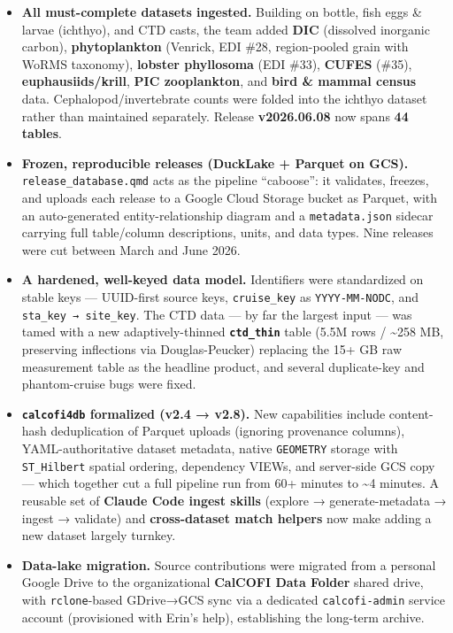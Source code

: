 \documentclass[
  letterpaper,
  DIV=11,
  numbers=noendperiod]{scrreprt}
\begin{document}
\begin{itemize}
\item
  \textbf{All must-complete datasets ingested.} Building on bottle, fish
  eggs \& larvae (ichthyo), and CTD casts, the team added \textbf{DIC}
  (dissolved inorganic carbon), \textbf{phytoplankton} (Venrick, EDI
  \#28, region-pooled grain with WoRMS taxonomy), \textbf{lobster
  phyllosoma} (EDI \#33), \textbf{CUFES} (\#35),
  \textbf{euphausiids/krill}, \textbf{PIC zooplankton}, and \textbf{bird
  \& mammal census} data. Cephalopod/invertebrate counts were folded
  into the ichthyo dataset rather than maintained separately. Release
  \textbf{v2026.06.08} now spans \textbf{44 tables}.
\item
  \textbf{Frozen, reproducible releases (DuckLake + Parquet on GCS).}
  \texttt{release\_database.qmd} acts as the pipeline ``caboose'': it
  validates, freezes, and uploads each release to a Google Cloud Storage
  bucket as Parquet, with an auto-generated entity-relationship diagram
  and a \texttt{metadata.json} sidecar carrying full table/column
  descriptions, units, and data types. Nine releases were cut between
  March and June 2026.
\item
  \textbf{A hardened, well-keyed data model.} Identifiers were
  standardized on stable keys --- UUID-first source keys,
  \texttt{cruise\_key} as \texttt{YYYY-MM-NODC}, and
  \texttt{sta\_key\ →\ site\_key}. The CTD data --- by far the largest
  input --- was tamed with a new adaptively-thinned
  \textbf{\texttt{ctd\_thin}} table (5.5M rows / \textasciitilde258 MB,
  preserving inflections via Douglas-Peucker) replacing the 15+ GB raw
  measurement table as the headline product, and several duplicate-key
  and phantom-cruise bugs were fixed.
\item
  \textbf{\texttt{calcofi4db} formalized (v2.4 → v2.8).} New
  capabilities include content-hash deduplication of Parquet uploads
  (ignoring provenance columns), YAML-authoritative dataset metadata,
  native \texttt{GEOMETRY} storage with \texttt{ST\_Hilbert} spatial
  ordering, dependency VIEWs, and server-side GCS copy --- which
  together cut a full pipeline run from 60+ minutes to \textasciitilde4
  minutes. A reusable set of \textbf{Claude Code ingest skills} (explore
  → generate-metadata → ingest → validate) and \textbf{cross-dataset
  match helpers} now make adding a new dataset largely turnkey.
\item
  \textbf{Data-lake migration.} Source contributions were migrated from
  a personal Google Drive to the organizational \textbf{CalCOFI Data
  Folder} shared drive, with \texttt{rclone}-based GDrive→GCS sync via a
  dedicated \texttt{calcofi-admin} service account (provisioned with
  Erin's help), establishing the long-term archive.
\end{itemize}
\end{document}
